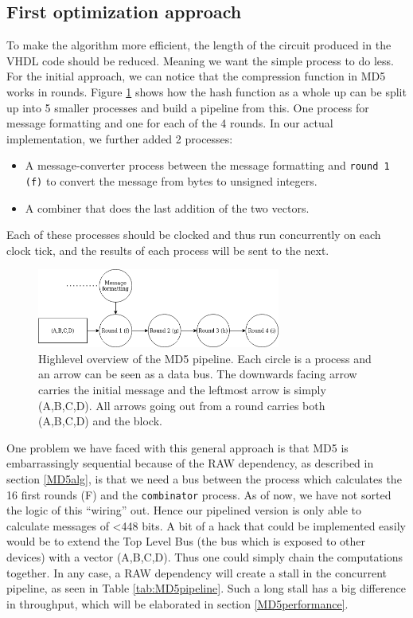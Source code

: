 \documentclass[a4paper, openany]{book}
\begin{document}
\begin{abstact}
\subsection{First optimization approach}
\label{sec:org360907c}
To make the algorithm more efficient, the length of the circuit produced in the VHDL code should be reduced. Meaning we want the simple process to do less. For the initial approach, we can notice that the compression function in MD5 works in rounds. Figure \ref{fig:MD5opt1} shows how the hash function as a whole up can be split up into 5 smaller processes and build a pipeline from this. One process for message formatting and one for each of the 4 rounds. In our actual implementation, we further added 2 processes:
\begin{itemize}
\item A message-converter process between the message formatting and \texttt{round 1 (f)} to convert the message from bytes to unsigned integers.
\item A combiner that does the last addition of the two vectors.
\end{itemize}
Each of these processes should be clocked and thus run concurrently on each clock tick, and the results of each process will be sent to the next.
\begin{figure}[H]
\centering
\includegraphics[width=8cm]{md5.png}
\caption[Pipeline MD5]{Highlevel overview of the MD5 pipeline. Each circle is a process and an arrow can be seen as a data bus. The downwards facing arrow carries the initial message and the leftmost arrow is simply (A,B,C,D). All arrows going out from a round carries both (A,B,C,D) and the block.}
\label{fig:MD5opt1}
\end{figure}
One problem we have faced with this general approach is that MD5 is embarrassingly sequential because of the RAW dependency, as described in section \ref{MD5alg}, is that we need a bus between the process which calculates the 16 first rounds (F) and the \texttt{combinator} process. As of now, we have not sorted the logic of this ``wiring'' out. Hence our pipelined version is only able to calculate messages of <448 bits. A bit of a hack that could be implemented easily would be to extend the Top Level Bus (the bus which is exposed to other devices) with a vector (A,B,C,D). Thus one could simply chain the computations together. In any case, a RAW dependency will create a stall in the concurrent pipeline, as seen in Table \ref{tab:MD5pipeline}. Such a long stall has a big difference in throughput, which will be elaborated in section \ref{MD5performance}.


\end{abstact}
\end{document}
